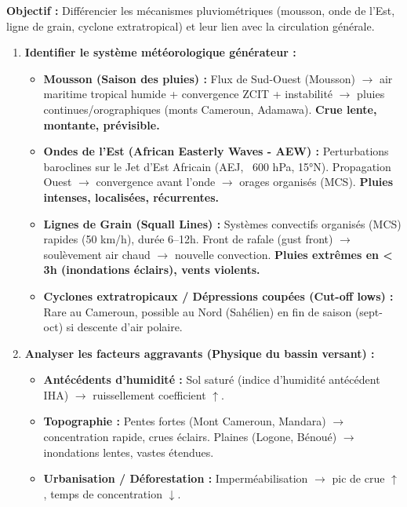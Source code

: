 \documentclass[11pt]{article}
\begin{document}
\begin{methode}
    \textbf{Objectif :} Différencier les mécanismes pluviométriques (mousson, onde de l'Est, ligne de grain, cyclone extratropical) et leur lien avec la circulation générale.
    \begin{enumerate}
        \item \textbf{Identifier le système météorologique générateur :}
              \begin{itemize}
                  \item \textbf{Mousson (Saison des pluies) :} Flux de Sud-Ouest (Mousson) $\rightarrow$ air maritime tropical humide + convergence ZCIT + instabilité $\rightarrow$ pluies continues/orographiques (monts Cameroun, Adamawa). \textbf{Crue lente, montante, prévisible.}
                  \item \textbf{Ondes de l'Est (African Easterly Waves - AEW) :} Perturbations baroclines sur le Jet d'Est Africain (AEJ, ~600 hPa, 15°N). Propagation Ouest $\rightarrow$ convergence avant l'onde $\rightarrow$ orages organisés (MCS). \textbf{Pluies intenses, localisées, récurrentes.}
                  \item \textbf{Lignes de Grain (Squall Lines) :} Systèmes convectifs organisés (MCS) rapides (50 km/h), durée 6--12h. Front de rafale (gust front) $\rightarrow$ soulèvement air chaud $\rightarrow$ nouvelle convection. \textbf{Pluies extrêmes en < 3h (inondations éclairs), vents violents.}
                  \item \textbf{Cyclones extratropicaux / Dépressions coupées (Cut-off lows) :} Rare au Cameroun, possible au Nord (Sahélien) en fin de saison (sept-oct) si descente d'air polaire.
              \end{itemize}
        \item \textbf{Analyser les facteurs aggravants (Physique du bassin versant) :}
              \begin{itemize}
                  \item \textbf{Antécédents d'humidité :} Sol saturé (indice d'humidité antécédent IHA) $\rightarrow$ ruissellement coefficient $\uparrow$.
                  \item \textbf{Topographie :} Pentes fortes (Mont Cameroun, Mandara) $\rightarrow$ concentration rapide, crues éclairs. Plaines (Logone, Bénoué) $\rightarrow$ inondations lentes, vastes étendues.
                  \item \textbf{Urbanisation / Déforestation :} Imperméabilisation $\rightarrow$ pic de crue $\uparrow$, temps de concentration $\downarrow$.

\end{itemize}
\end{enumerate}
\end{methode}
\end{document}
